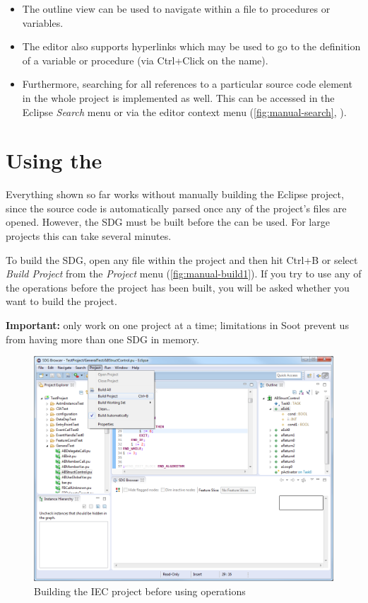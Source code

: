 \begin{itemize}
  \item The outline view can be used to navigate within a file to procedures or variables.
  
  \item The editor also supports hyperlinks which may be used to go to the definition of a variable or procedure (via 
  Ctrl+Click on the name).
  
  \item Furthermore, searching for all references to a particular source code element in the whole project is 
  implemented as well. This can be accessed in the Eclipse \emph{Search} menu or via the editor context menu 
  (\autoref{fig:manual-search}, ).
\end{itemize}


\section{Using the \SB} \label{sec:manual-sdg}

Everything shown so far works without manually building the Eclipse project, since the source code is automatically 
parsed once any of the project's files are opened. However, the SDG must be built before the \SB can be used. For large 
projects this can take several minutes.

To build the SDG, open any file within the project and then hit Ctrl+B or select \emph{Build Project} from the 
\emph{Project} menu (\autoref{fig:manual-build1}). If you try to use any of the \SB operations before the project has 
been built, you will be asked whether you want to build the project.

\textbf{Important:} only work on one project at a time; limitations in Soot prevent us from having more than one SDG in 
memory.

\begin{figure}[hp]
  \centering
    \includegraphics[width=\textwidth]{bilder/manual-build1}
  \caption{Building the IEC project before using \SB operations}
  \label{fig:manual-build1}
\end{figure}

